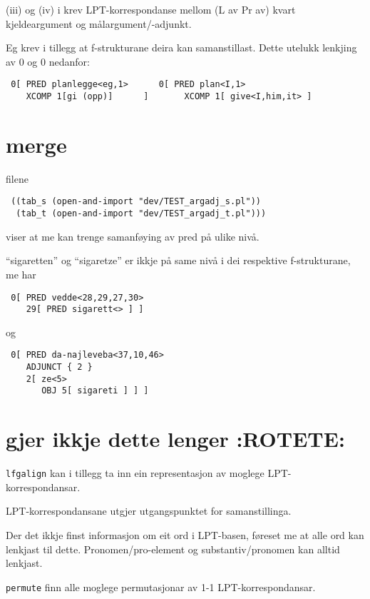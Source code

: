 \documentclass[11pt,a4paper,oneside,draft]{book}
\begin{document}
(iii) og (iv) i \citet[s.~75]{dyvik2009lmp} krev LPT-korrespondanse
mellom (L av Pr av) kvart kjeldeargument og målargument/-adjunkt. 

Eg krev i tillegg at f-strukturane deira kan samanstillast. Dette
utelukk lenkjing av 0 og 0 nedanfor:

\begin{verbatim}
 0[ PRED planlegge<eg,1>      0[ PRED plan<I,1>
    XCOMP 1[gi (opp)]      ]       XCOMP 1[ give<I,him,it> ]
\end{verbatim}




\section{merge}
\label{sec-4.3}

filene 
\begin{verbatim}
 ((tab_s (open-and-import "dev/TEST_argadj_s.pl"))
  (tab_t (open-and-import "dev/TEST_argadj_t.pl")))
\end{verbatim}

viser at me kan trenge samanføying av pred på ulike nivå.

``sigaretten'' og ``sigaretze'' er ikkje på same nivå i dei respektive
f-strukturane, me har
\begin{verbatim}
 0[ PRED vedde<28,29,27,30>
    29[ PRED sigarett<> ] ]
\end{verbatim}

og
\begin{verbatim}
 0[ PRED da-najleveba<37,10,46>
    ADJUNCT { 2 }
    2[ ze<5>
       OBJ 5[ sigareti ] ] ]
\end{verbatim}


\section{gjer ikkje dette lenger \textbf{:ROTETE:}}
\label{sec-4.4}

\texttt{lfgalign} kan i tillegg ta inn ein representasjon av moglege
LPT-korrespondansar.

LPT-korrespondansane utgjer utgangspunktet for samanstillinga. 

Der det ikkje finst informasjon om eit ord i LPT-basen, føreset me at
alle ord kan lenkjast til dette. Pronomen/pro-element og
substantiv/pronomen kan alltid lenkjast.

\texttt{permute} finn alle moglege permutasjonar av 1-1
LPT-korrespondansar. 
\end{document}
